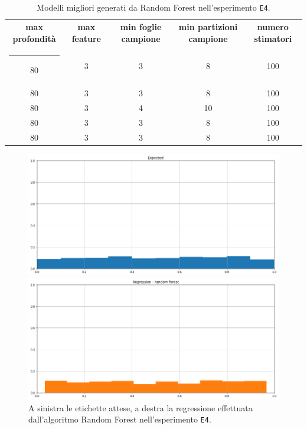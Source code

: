 \documentclass[12pt]{report}
\makeatletter
\theoremstyle{definition}
\newcommand{\thickhline}{%
    \noalign {\ifnum 0=`}\fi \hrule height 1pt
    \futurelet \reserved@a \@xhline
}
\makeatother
\begin{document}
\begin{table}
\centering
\begin{adjustbox}{max width=\textwidth}
 \begin{tabular}{|c|c|c|c|c|} 
 \hline
\textbf{max profondità} & \textbf{max feature} & \textbf{min foglie campione} & \textbf{min partizioni campione} & \textbf{numero stimatori}
\\ [0.5ex] 
 \thickhline
 80 & 3 & 3 & 8 & 100 \\ 
 80 & 3 & 3 & 8 & 100 \\ 
 80 & 3 & 4 & 10 & 100 \\ 
 80 & 3 & 3 & 8 & 100 \\ 
 80 & 3 & 3 & 8 & 100 \\ 
 \hline
\end{tabular}
\end{adjustbox}
\caption{Modelli migliori generati da Random Forest nell'esperimento \texttt{E4}.}
\label{models_rf_exp4}
\end{table}

\begin{figure}
\centering
    \begin{minipage}{0.48\textwidth}
        \includegraphics[width=\linewidth]{images/experiment_uniform_sovrapposti/expected_memberships.png}
    \end{minipage}
    \begin{minipage}{0.48\textwidth}
        \includegraphics[width=\linewidth]{images/experiment_uniform_sovrapposti/prediction_regression_rf.png}
    \end{minipage}
    \caption{A sinistra le etichette attese, a destra la regressione effettuata dall'algoritmo Random Forest nell'esperimento \texttt{E4}.}
    \label{rf_exp4}
\end{figure} 
\end{document}
